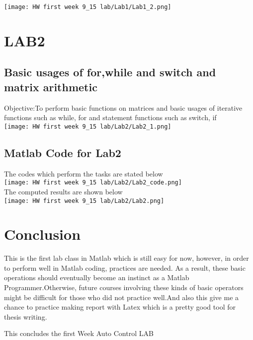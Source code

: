 \documentclass[12pt]{article}
\begin{document}
\texttt{[image: HW first week 9\_15 lab/Lab1/Lab1\_2.png]}\\
 
\cleardoublepage
\section{LAB2}
\subsection{Basic usages of for,while and switch and matrix arithmetic}
Objective:To perform basic functions on matrices and basic usages of iterative functions such as while, for and statement functions such as switch, if\\

\texttt{[image: HW first week 9\_15 lab/Lab2/Lab2\_1.png]}

\subsection{Matlab Code for Lab2}
The codes which perform the tasks are stated below\\ 
\texttt{[image: HW first week 9\_15 lab/Lab2/Lab2\_code.png]} \\
The computed results are shown below\\
\texttt{[image: HW first week 9\_15 lab/Lab2/Lab2.png]}

\section{Conclusion}
This is the first lab class in Matlab which is still easy for now, however, in order to perform well in Matlab coding, practices are needed. As a result, these basic operations should eventually become an instinct as a Matlab Programmer.Otherwise, future courses involving these kinds of basic operators might be difficult for those who did not practice well.And also this give me a chance to practice making report with Latex which is a pretty good tool for thesis writing.\\
\begin{center} 
This concludes the first Week Auto Control LAB\\
\end{center}
\end{document}
